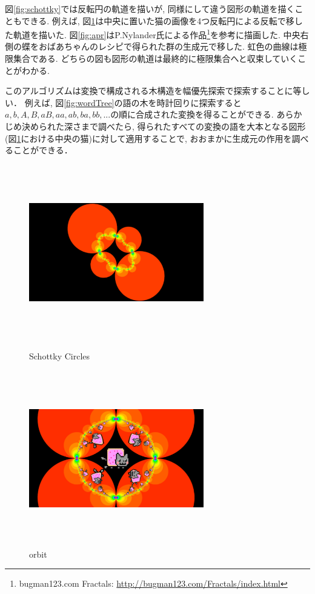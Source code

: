 図\ref{fig:schottky}では反転円の軌道を描いが, 同様にして違う図形の軌道を描くこともできる.
例えば, 図\ref{fig:orbit}は中央に置いた猫の画像を4つ反転円による反転で移した軌道を描いた.
図\ref{fig:apr}はP.Nylander氏による作品\footnote{bugman123.com Fractals: \url{http://bugman123.com/Fractals/index.html}}を参考に描画した.
中央右側の蝶をおばあちゃんのレシピで得られた群の生成元で移した.
虹色の曲線は極限集合である.
どちらの図も図形の軌道は最終的に極限集合へと収束していくことがわかる.

このアルゴリズムは変換で構成される木構造を幅優先探索で探索することに等しい．
例えば, 図\ref{fig:wordTree}の語の木を時計回りに探索すると$a, b, A, B, aB, aa, ab, ba, bb, ...$の順に合成された変換を得ることができる.
あらかじめ決められた深さまで調べたら, 得られたすべての変換の語を大本となる図形(図\ref{fig:orbit}における中央の猫)に対して適用することで, おおまかに生成元の作用を調べることができる．


\begin{figure}[htbp]
 \begin{minipage}{0.49\hsize}
  \begin{center}
   \includegraphics[width=3in, height=3in, keepaspectratio]{../img/klein/schottkyCircles.pdf}
   \caption{Schottky Circles}
   \label{fig:schottky}
  \end{center}
 \end{minipage}
 \begin{minipage}{0.49\hsize}
  \begin{center}
   \includegraphics[width=3in, height=3in, keepaspectratio]{../img/klein/circleOrbit.pdf}
   \caption{orbit}
   \label{fig:orbit}
  \end{center}
 \end{minipage}
\end{figure}



